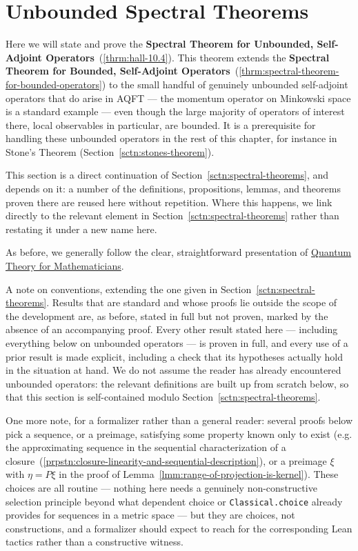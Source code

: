 \section{Unbounded Spectral Theorems}\label{sctn:unbounded-spectral-theorems}
Here we will state and prove the \textbf{Spectral Theorem for Unbounded, Self-Adjoint Operators}~(\ref{thrm:hall-10.4}). This theorem extends the \textbf{Spectral Theorem for Bounded, Self-Adjoint Operators}~(\ref{thrm:spectral-theorem-for-bounded-operators}) to the small handful of genuinely unbounded self-adjoint operators that do arise in AQFT — the momentum operator on Minkowski space is a standard example — even though the large majority of operators of interest there, local observables in particular, are bounded. It is a prerequisite for handling these unbounded operators in the rest of this chapter, for instance in Stone's Theorem (Section~\ref{sctn:stones-theorem}).

This section is a direct continuation of Section~\ref{sctn:spectral-theorems}, and depends on it: a number of the definitions, propositions, lemmas, and theorems proven there are reused here without repetition. Where this happens, we link directly to the relevant element in Section~\ref{sctn:spectral-theorems} rather than restating it under a new name here.

As before, we generally follow the clear, straightforward presentation of \href{https://doi.org/10.1007/978-1-4614-7116-5}{Quantum Theory for Mathematicians}.

A note on conventions, extending the one given in Section~\ref{sctn:spectral-theorems}. Results that are standard and whose proofs lie outside the scope of the development are, as before, stated in full but not proven, marked by the absence of an accompanying proof. Every other result stated here — including everything below on unbounded operators — is proven in full, and every use of a prior result is made explicit, including a check that its hypotheses actually hold in the situation at hand. We do not assume the reader has already encountered unbounded operators: the relevant definitions are built up from scratch below, so that this section is self-contained modulo Section~\ref{sctn:spectral-theorems}.

One more note, for a formalizer rather than a general reader: several proofs below pick a sequence, or a preimage, satisfying some property known only to exist (e.g. the approximating sequence in the sequential characterization of a closure~(\ref{prpstn:closure-linearity-and-sequential-description}), or a preimage $\xi$ with $\eta = P\xi$ in the proof of Lemma~\ref{lmm:range-of-projection-is-kernel}). These choices are all routine — nothing here needs a genuinely non-constructive selection principle beyond what dependent choice or \texttt{Classical.choice} already provides for sequences in a metric space — but they are choices, not constructions, and a formalizer should expect to reach for the corresponding Lean tactics rather than a constructive witness.

